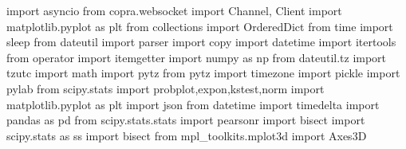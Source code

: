 import asyncio
from copra.websocket import Channel, Client
import matplotlib.pyplot as plt
from collections import OrderedDict
from time import sleep
from dateutil import parser
import copy
import datetime
import itertools
from operator import itemgetter
import numpy as np
from dateutil.tz import tzutc
import math
import pytz
from pytz import timezone
import pickle
import pylab
from scipy.stats import probplot,expon,kstest,norm
import matplotlib.pyplot as plt
import json
from datetime import timedelta
import pandas as pd
from scipy.stats.stats import pearsonr
import bisect
import scipy.stats as ss
import bisect
from mpl_toolkits.mplot3d import Axes3D